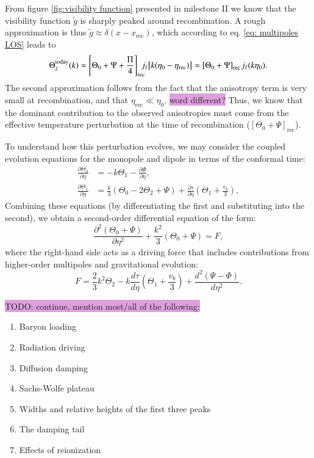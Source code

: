 \documentclass{aa}
\numberwithin{equation}{section}
\numberwithin{table}{section}
\numberwithin{figure}{section}
\begin{document}
From figure \ref{fig:visibility function} presented in milestone II we know that the visibility function $\tilde{g}$ is sharply peaked around recombination. A rough approximation is thus $\tilde{g}\approx\delta(x-x_\text{rec})$, which according to eq. \eqref{eq: multipoles LOS} leads to
\begin{equation}
  \Theta^\text{today}_\ell(k) \approx \left[ \Theta_0+\Psi+\frac{\Pi}{4}\right]_\text{rec}\hspace{-6pt}j_\ell\big[k(\eta_0 - \eta_\text{rec})\big] \approx \left[ \Theta_0+\Psi\right]_\text{rec}\hspace{-1pt}j_\ell(k\eta_0).
\end{equation}
The second approximation follows from the fact that the anisotropy term is very small at recombination, and that $\eta_\text{rec}\ll\eta_0$. \colorbox{Plum}{word different?} Thus, we know that the dominant contribution to the observed anisotropies must come from the effective temperature perturbation at the time of recombination ($\left[ \Theta_0+\Psi\right]_\text{rec}$). 

To understand how this perturbation evolves, we may consider the coupled evolution equations for the monopole and dipole in terms of the conformal time:
\begin{align}
\frac{\partial \Theta_0}{\partial \eta} &= -k \Theta_1 - \frac{\partial \Phi}{\partial \eta}, \\
\frac{\partial \Theta_1}{\partial \eta} &= \frac{k}{3}(\Theta_0 - 2\Theta_2 + \Psi) + \frac{\partial \tau}{\partial \eta} \left( \Theta_1 + \frac{v_b}{3} \right),
\end{align}
Combining these equations (by differentiating the first and substituting into the second), we obtain a second-order differential equation of the form:
\begin{equation}
\frac{\partial^2 (\Theta_0 + \Psi)}{\partial \eta^2} + \frac{k^2}{3} (\Theta_0 + \Psi) = F, \label{eq: forced}
\end{equation}
where the right-hand side acts as a driving force that includes contributions from higher-order multipoles and gravitational evolution:
\begin{equation}
F = \frac{2}{3}k^2 \Theta_2 - k \frac{d\tau}{d\eta} \left( \Theta_1 + \frac{v_b}{3} \right) + \frac{d^2 (\Psi - \Phi)}{d\eta^2}.
\end{equation}

\colorbox{Plum}{TODO: continue, mention most/all of the following:}
\begin{enumerate}
  \item Baryon loading
  \item Radiation driving
  \item Diffusion damping
  \item Sachs-Wolfe plateau 
  \item Widths and relative heights of the first three peaks
  \item The damping tail
  \item Effects of reionization
\end{enumerate}
\end{document}
